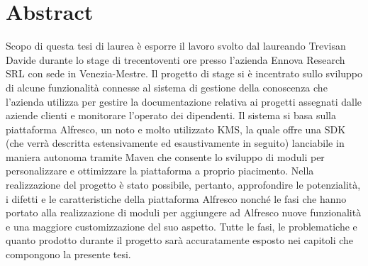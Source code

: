
\cleardoublepage
{}
{}
\begingroup
\let\clearpage\relax
\let\cleardoublepage\relax
\let\cleardoublepage\relax

\chapter*{Abstract}

Scopo di questa tesi di laurea è esporre il lavoro svolto dal laureando Trevisan Davide
durante lo stage di trecentoventi ore presso l’azienda Ennova Research SRL con sede in
Venezia-Mestre.
Il progetto di stage si è incentrato sullo sviluppo di alcune funzionalità connesse
al sistema di gestione della conoscenza che l’azienda utilizza per gestire la documentazione relativa ai progetti assegnati dalle aziende clienti e monitorare l’operato dei dipendenti. Il sistema si basa sulla piattaforma Alfresco, un noto e molto utilizzato \gls{KMS}, la quale offre una SDK (che verrà descritta estensivamente ed esaustivamente in seguito) lanciabile in maniera autonoma tramite Maven che consente lo sviluppo di moduli per personalizzare e ottimizzare la piattaforma a proprio piacimento. Nella realizzazione del progetto è stato possibile, pertanto, approfondire le potenzialità, i difetti e le caratteristiche della piattaforma Alfresco nonché le fasi che hanno portato alla realizzazione di moduli per aggiungere ad Alfresco nuove funzionalità e una maggiore customizzazione del suo aspetto.
Tutte le fasi, le problematiche e quanto prodotto durante il progetto sarà accuratamente esposto nei capitoli che compongono la presente tesi.
%
%

\endgroup			

\vfill

